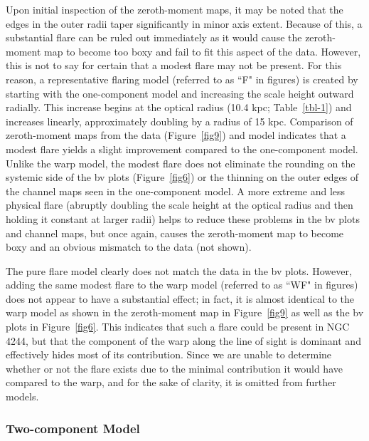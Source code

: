 \documentclass{emulateapj}
\begin{document}
\par
     Upon initial inspection of the zeroth-moment maps, it may be noted that the edges in the outer radii taper significantly in minor axis extent.  Because of this, a substantial flare can be ruled out immediately as it would cause the zeroth-moment map to become too boxy and fail to fit this aspect of the data.  However, this is not to say for certain that a modest flare may not be present.  For this reason, a representative flaring model (referred to as ``F" in figures) is created by starting with the one-component model and increasing the scale height outward radially.  This increase begins at the optical radius (10.4 kpc; Table~\ref{tbl-1}) and increases linearly, approximately doubling by a radius of 15 kpc.  Comparison of zeroth-moment maps from the data (Figure~\ref{fig9}) and model indicates that a modest flare yields a slight improvement compared to the one-component model.  Unlike the warp model, the modest flare does not eliminate the rounding on the systemic side of the bv plots (Figure~\ref{fig6}) or the thinning on the outer edges of the channel maps seen in the one-component model.  A more extreme and less physical flare (abruptly doubling the scale height at the optical radius and then holding it constant at larger radii) helps to reduce these problems in the bv plots and channel maps, but once again, causes the zeroth-moment map to become boxy and an obvious mismatch to the data (not shown).  

\par 
     The pure flare model clearly does not match the data in the bv plots.  However, adding the same modest flare to the warp model (referred to as ``WF" in figures) does not appear to have a substantial effect; in fact, it is almost identical to the warp model as shown in the zeroth-moment map in Figure~\ref{fig9} as well as the bv plots in Figure~\ref{fig6}.  This indicates that such a flare could be present in NGC 4244, but that the component of the warp along the line of sight is dominant and effectively hides most of its contribution.  Since we are unable to determine whether or not the flare exists due to the minimal contribution it would have compared to the warp, and for the sake of clarity, it is omitted from further models.
  
     
\subsubsection{Two-component Model} \label{Section4.2.4}
\end{document}
